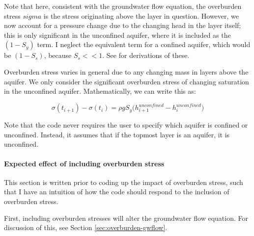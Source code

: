 \documentclass{article}
\begin{document}
Note that here, consistent with the groundwater flow equation, the overburden stress $sigma$ is the stress originating above the layer in question. However, we now account for a pressure change due to the changing head in the layer itself; this is only significant in the unconfined aquifer, where it is included as the $(1-S_y)$ term. I neglect the equivalent term for a confined aquifer, which would be $(1-S_s)$, because $S_s << 1$. See \cite{poland_land_1969} for derivations of these. 

Overburden stress varies in general due to any changing mass in layers above the aquifer. We only consider the significant overburden stress of changing saturation in the unconfined aquifer. Mathematically, we can write this as:

\begin{equation}
\label{eq:overburden}
\sigma (t_{i+1}) - \sigma(t_i) = \rho g S_y \big( h^{unconfined}_{i+1} - h^{unconfined}_i \big)
\end{equation}

Note that the code never requires the user to specify which aquifer is confined or unconfined. Instead, it assumes that if the topmost layer is an aquifer, it is unconfined.

\paragraph{Expected effect of including overburden stress}
\label{sec:overburden-compaction}

This section is written prior to coding  up the impact of overburden stress, such that I have an intuition of how the code should respond to the inclusion of overburden stress. 

First, including overburden stresses will alter the groundwater flow equation. For discussion of this, see Section \ref{sec:overburden-gwflow}.

\end{document}
